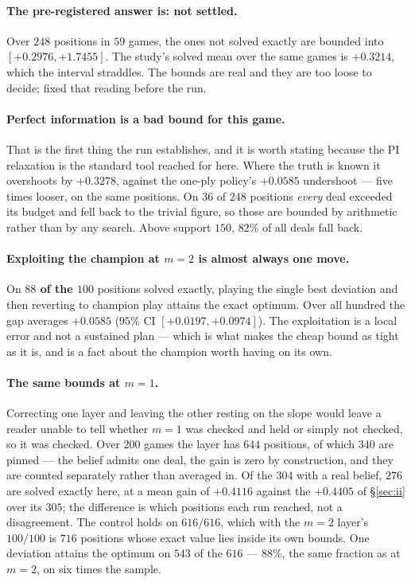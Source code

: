 \documentclass[11pt,a4paper]{article}
\begin{document}
\paragraph{The pre-registered answer is: not settled.} Over $248$ positions in
$59$ games, the ones not solved exactly are bounded into
$[\mathbf{+0.2976}, \mathbf{+1.7455}]$. The study's solved mean over the same
games is $+0.3214$, which the interval straddles. The bounds are real and they
are too loose to decide;  fixed that reading
before the run.

\paragraph{Perfect information is a bad bound for this game.} That is the
first thing the run establishes, and it is worth stating because the PI
relaxation is the standard tool reached for here. Where the truth is known it
overshoots by $+0.3278$, against the one-ply policy's $+0.0585$ undershoot ---
five times looser, on the same positions. On $36$ of $248$ positions
\emph{every} deal exceeded its budget and fell back to the trivial figure, so
those are bounded by arithmetic rather than by any search. Above support
$150$, $82\%$ of all deals fall back.

\paragraph{Exploiting the champion at $m = 2$ is almost always one move.}
On \textbf{$88$ of the $100$} positions solved exactly, playing the single best
deviation and then reverting to champion play attains the exact optimum. Over
all hundred the gap averages $+0.0585$ ($95\%$ CI $[+0.0197, +0.0974]$). The
exploitation is a local error and not a sustained plan --- which is what makes
the cheap bound as tight as it is, and is a fact about the champion worth
having on its own.

\paragraph{The same bounds at $m = 1$.} Correcting one layer and leaving the
other resting on the slope would leave a reader unable to tell whether $m = 1$
was checked and held or simply not checked, so it was checked. Over $200$
games the layer has $644$ positions, of which $340$ are pinned --- the belief
admits one deal, the gain is zero by construction, and they are counted
separately rather than averaged in. Of the $304$ with a real belief, $276$ are
solved exactly here, at a mean gain of $+0.4116$ against the $+0.4405$ of
\S\ref{sec:ii} over its $305$; the difference is which positions each run
reached, not a disagreement. The control holds on \textbf{$616/616$}, which
with the $m = 2$ layer's $100/100$ is $716$ positions whose exact value lies
inside its own bounds. One deviation attains the optimum on $543$ of the $616$
--- $88\%$, the same fraction as at $m = 2$, on six times the sample.
\end{document}
